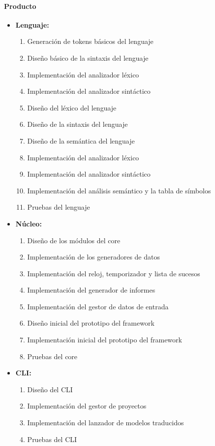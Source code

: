 \paragraph{Producto}
\begin{itemize}
    \item \textbf{Lenguaje:}
    \begin{enumerate}
        \item Generación de tokens básicos del lenguaje
        \item Diseño básico de la sintaxis del lenguaje
        \item Implementación del analizador léxico
        \item Implementación del analizador sintáctico
        \item Diseño del léxico del lenguaje
        \item Diseño de la sintaxis del lenguaje
        \item Diseño de la semántica del lenguaje
        \item Implementación del analizador léxico
        \item Implementación del analizador sintáctico
        \item Implementación del análisis semántico y la tabla de símbolos
        \item Pruebas del lenguaje
    \end{enumerate}
    \item \textbf{Núcleo:}
    \begin{enumerate}
        \item Diseño de los módulos del core
        \item Implementación de los generadores de datos
        \item Implementación del reloj, temporizador y lista de sucesos
        \item Implementación del generador de informes
        \item Implementación del gestor de datos de entrada
        \item Diseño inicial del prototipo del framework
        \item Implementación inicial del prototipo del framework
        \item Pruebas del core
    \end{enumerate}
    \item \textbf{CLI:}
    \begin{enumerate}
        \item Diseño del CLI
        \item Implementación del gestor de proyectos
        \item Implementación del lanzador de modelos traducidos
        \item Pruebas del CLI
    \end{enumerate}
\end{itemize}


